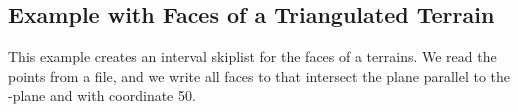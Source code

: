 \subsection{Example with Faces of a Triangulated Terrain}

This example creates an interval skiplist for the faces of a terrains.
We read the points from a file, and we write all faces to 
that intersect the plane parallel to the -plane and with 
coordinate 50.








